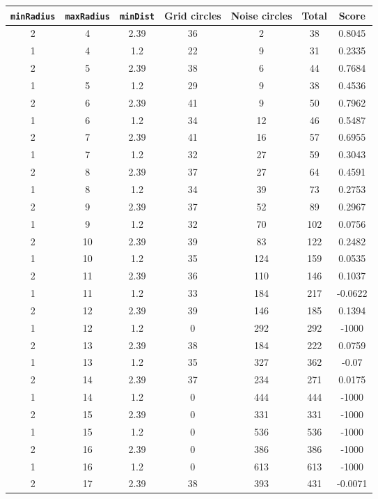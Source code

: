 \documentclass[letterpaper, 12pt]{article}
\begin{document}
\begin{longtable}{|c|c|c|c|c|c|c|}
\hline
\textbf{\texttt{minRadius}} & \textbf{\texttt{maxRadius}} & \textbf{\texttt{minDist}} & \textbf{Grid circles} & \textbf{Noise circles} & \textbf{Total} & \textbf{Score} \\
\hline
2 & 4 & 2.39 & 36 & 2 & 38 & 0.8045 \\
\hline
1 & 4 & 1.2 & 22 & 9 & 31 & 0.2335 \\
\hline
2 & 5 & 2.39 & 38 & 6 & 44 & 0.7684 \\
\hline
1 & 5 & 1.2 & 29 & 9 & 38 & 0.4536 \\
\hline
2 & 6 & 2.39 & 41 & 9 & 50 & 0.7962 \\
\hline
1 & 6 & 1.2 & 34 & 12 & 46 & 0.5487 \\
\hline
2 & 7 & 2.39 & 41 & 16 & 57 & 0.6955 \\
\hline
1 & 7 & 1.2 & 32 & 27 & 59 & 0.3043 \\
\hline
2 & 8 & 2.39 & 37 & 27 & 64 & 0.4591 \\
\hline
1 & 8 & 1.2 & 34 & 39 & 73 & 0.2753 \\
\hline
2 & 9 & 2.39 & 37 & 52 & 89 & 0.2967 \\
\hline
1 & 9 & 1.2 & 32 & 70 & 102 & 0.0756 \\
\hline
2 & 10 & 2.39 & 39 & 83 & 122 & 0.2482 \\
\hline
1 & 10 & 1.2 & 35 & 124 & 159 & 0.0535 \\
\hline
2 & 11 & 2.39 & 36 & 110 & 146 & 0.1037 \\
\hline
1 & 11 & 1.2 & 33 & 184 & 217 & -0.0622 \\
\hline
2 & 12 & 2.39 & 39 & 146 & 185 & 0.1394 \\
\hline
1 & 12 & 1.2 & 0 & 292 & 292 & -1000 \\
\hline
2 & 13 & 2.39 & 38 & 184 & 222 & 0.0759 \\
\hline
1 & 13 & 1.2 & 35 & 327 & 362 & -0.07 \\
\hline
2 & 14 & 2.39 & 37 & 234 & 271 & 0.0175 \\
\hline
1 & 14 & 1.2 & 0 & 444 & 444 & -1000 \\
\hline
2 & 15 & 2.39 & 0 & 331 & 331 & -1000 \\
\hline
1 & 15 & 1.2 & 0 & 536 & 536 & -1000 \\
\hline
2 & 16 & 2.39 & 0 & 386 & 386 & -1000 \\
\hline
1 & 16 & 1.2 & 0 & 613 & 613 & -1000 \\
\hline
2 & 17 & 2.39 & 38 & 393 & 431 & -0.0071 \\

\end{longtable}
\end{document}

